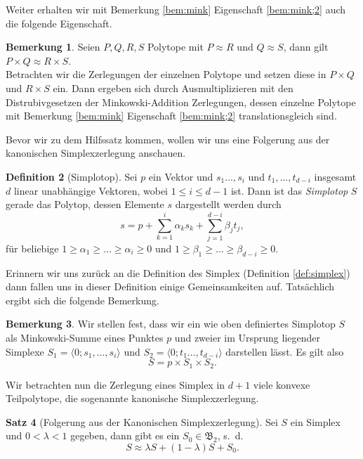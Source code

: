 \documentclass[11pt,titlepage]{article}
\theoremstyle{definition}
\newtheorem{theorem}{Satz}[section]
\newtheorem{definition}[theorem]{Definition}
\newtheorem{remark}[theorem]{Bemerkung}
\theoremstyle{remark}
\begin{document}
	Weiter erhalten wir mit Bemerkung \ref{bem:mink} Eigenschaft \ref{bem:mink;2} 
	auch die folgende Eigenschaft.
	\begin{remark}\label{bem:mink;zerl}
		Seien $P,Q,R,S$ Polytope mit $P\approx R$ und $Q\approx S$, dann gilt 
		$P\times Q\approx R\times S$. \\
		Betrachten wir die Zerlegungen der einzelnen Polytope und setzen diese in 
		$P\times Q$ und $R\times S$ ein. Dann ergeben sich durch Ausmultiplizieren 
		mit den Distrubivgesetzen der Minkowski-Addition Zerlegungen, dessen 
		einzelne Polytope mit Bemerkung 
		\ref{bem:mink} Eigenschaft \ref{bem:mink;2} translationsgleich sind.
	\end{remark}
	
	Bevor wir zu dem Hilfssatz kommen, wollen wir uns eine Folgerung aus der kanonischen 
	Simplexzerlegung anschauen. 
		
	\begin{definition}[Simplotop]
		Sei $p$ ein Vektor und  $s_1\ldots,s_i$ und 
		$t_1,\ldots,t_{d-i}$ insgesamt 
		$d$ linear unabhängige Vektoren, wobei $1\leq i\leq d-1$ ist. Dann ist 
		das \textsl{Simplotop} $S$ gerade das Polytop, dessen Elemente $s$ 
		dargestellt werden durch
		\[s=p+\sum_{k=1}^i \alpha_k s_k +\sum_{j=1}^{d-i}\beta_j t_j,\]
		für beliebige $1\geq \alpha_1\geq\ldots\geq\alpha_i\geq 0$ und 
		$1\geq \beta_1\geq\ldots\geq\beta_{d-i}\geq 0$.
	\end{definition}
	
	Erinnern wir uns zurück an die Definition des Simplex (Definition \ref{def:simplex}) dann fallen uns in dieser Definition einige Gemeinsamkeiten 
	auf. Tatsächlich ergibt sich die folgende Bemerkung.
	
	\begin{remark}
		Wir stellen fest, dass wir ein wie oben definiertes Simplotop $S$ 
		als Minkowski-Summe eines Punktes $p$ und zweier 
		im Ursprung liegender Simplexe $S_1=\langle 0;s_1,\ldots,s_i\rangle$ 
		und $S_2=\langle 0;t_1\ldots,t_{d-i}\rangle$ darstellen lässt. 
		Es gilt also 
		\[S=p\times S_1 \times S_2.\]
	\end{remark}
	
	Wir betrachten nun die Zerlegung eines Simplex in $d+1$ viele konvexe 
	Teilpolytope, die sogenannte kanonische Simplexzerlegung. 
	
	\begin{theorem}[Folgerung aus der Kanonischen Simplexzerlegung]\label{thm:kanonsimpl}
		Sei $S$ ein Simplex und $0<\lambda<1$ gegeben, dann 
		gibt es ein $S_0\in\mathfrak{B}_2$, s.~d.
		\[S\approx \lambda S+(1-\lambda)S +S_0.\]
	\end{theorem}
	
\end{document}
